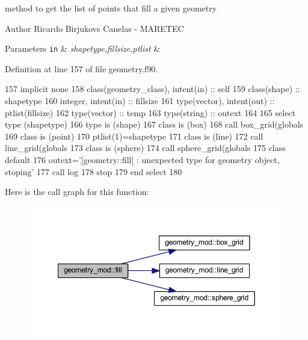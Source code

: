 method to get the list of points that fill a given geometry 

\begin{DoxyAuthor}{Author}
Ricardo Birjukovs Canelas -\/ M\+A\+R\+E\+T\+EC
\end{DoxyAuthor}

\begin{DoxyParams}[1]{Parameters}
\mbox{\tt in}  & {\em shapetype,fillsize,ptlist} & \\
\hline
\end{DoxyParams}


Definition at line 157 of file geometry.\+f90.


\begin{DoxyCode}
157     \textcolor{keywordtype}{implicit none}
158     \textcolor{keywordtype}{class}(geometry\_class), \textcolor{keywordtype}{intent(in)} :: self
159     \textcolor{keywordtype}{class}(shape) :: shapetype
160     \textcolor{keywordtype}{integer}, \textcolor{keywordtype}{intent(in)} :: fillsize
161     \textcolor{keywordtype}{type}(vector), \textcolor{keywordtype}{intent(out)} :: ptlist(fillsize)
162     \textcolor{keywordtype}{type}(vector) :: temp
163     \textcolor{keywordtype}{type}(string) :: outext
164 
165     \textcolor{keywordflow}{select type} (shapetype)
166 \textcolor{keywordflow}{    type is} (shape)
167 \textcolor{keywordflow}{    class is} (box)
168         \textcolor{keyword}{call }box\_grid(globals%
169 \textcolor{keywordflow}{    class is} (point)
170         ptlist(1)=shapetype%
171 \textcolor{keywordflow}{    class is} (line)
172         \textcolor{keyword}{call }line\_grid(globals%
173 \textcolor{keywordflow}{    class is} (sphere)
174         \textcolor{keyword}{call }sphere\_grid(globals%
175 \textcolor{keywordflow}{        class default}
176         outext=\textcolor{stringliteral}{'[geometry::fill] : unexpected type for geometry object, stoping'}
177         \textcolor{keyword}{call }log%
178         stop
179 \textcolor{keywordflow}{    end select}
180 
\end{DoxyCode}
Here is the call graph for this function\+:\nopagebreak
\begin{figure}[H]
\begin{center}
\leavevmode
\includegraphics[width=349pt]{namespacegeometry__mod_a095a8b47b3c23e154dcd31ab1441a065_cgraph}
\end{center}
\end{figure}
